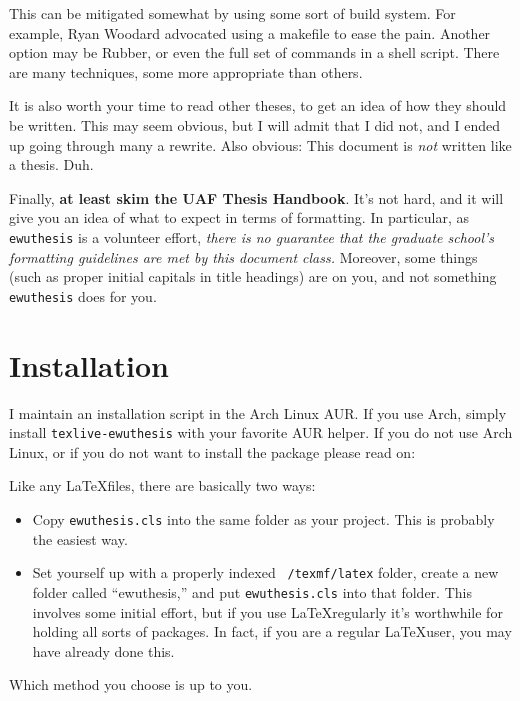 This can be mitigated somewhat by using some sort of build system. For example,
Ryan Woodard advocated using a makefile to ease the pain. Another option may
be Rubber, or even the full set of commands in a shell script. There are many
techniques, some more appropriate than others. \cite{buildsystems}

It is also worth your time to read other theses, to get an idea of how they
should be written. This may seem obvious, but I will admit that I did not, and
I ended up going through many a rewrite. Also obvious: This document is
\emph{not} written like a thesis. Duh.

Finally, \textbf{at least skim the UAF Thesis Handbook}. \cite{handbook} It's
not hard, and it will give you an idea of what to expect in terms of formatting.
In particular, as \texttt{ewuthesis} is a volunteer effort, \emph{there is no
guarantee that the graduate school's formatting guidelines are met by this
document class.} Moreover, some things (such as proper initial capitals in title
headings) are on you, and not something \texttt{ewuthesis} does for you.


\section{Installation}

I maintain an installation script in the Arch Linux AUR.  If you use Arch, simply install \texttt{texlive-ewuthesis} with your favorite AUR helper.  If you do not use Arch Linux, or if you do not want to install the package please read on:

Like any \LaTeX files, there are basically two ways:

\begin{itemize}
\item Copy \texttt{ewuthesis.cls} into the same folder as your project. This is
probably the easiest way.
\item Set yourself up with a properly indexed \texttt{~/texmf/latex} folder,
create a new folder called ``ewuthesis,'' and put \texttt{ewuthesis.cls} into
that folder. This involves some initial effort, but if you use \LaTeX regularly
it's worthwhile for holding all sorts of packages. In fact, if you are a
regular \LaTeX user, you may have already done this.
\end{itemize}

Which method you choose is up to you.
